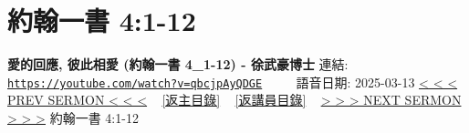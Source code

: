 \documentclass{book}
\begin{document}
\section{約翰一書 4:1-12}
\label{sec:qbcjpAyQDGE}
\textbf{愛的回應, 彼此相愛 (約翰一書 4\_1-12) - 徐武豪博士}
\newline
\newline
連結: \href{https://youtube.com/watch?v=qbcjpAyQDGE}{\texttt{https://youtube.com/watch?v=qbcjpAyQDGE}} ~~~~ 語音日期: 2025-03-13
\newline
\newline
\hyperref[sec:K8E95o7ZcvU]{< < < PREV SERMON < < <}
~
\hyperlink{toc}{[返主目錄]}
~
\hyperref[ch:preacher4]{[返講員目錄]}
~
\hyperref[sec:l7wNnYvML2Y]{> > > NEXT SERMON > > >}
\newline
\newline
約翰一書 4:1-12
\newline
\end{document}
